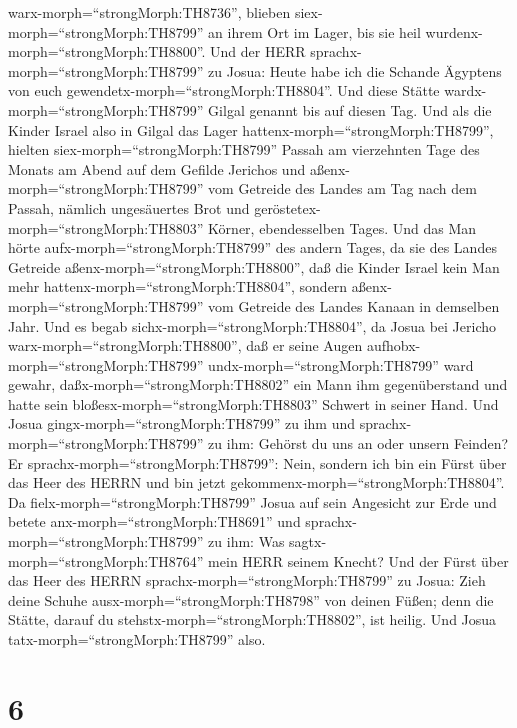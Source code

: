 warx-morph=``strongMorph:TH8736'', blieben
siex-morph=``strongMorph:TH8799'' an ihrem Ort im Lager, bis sie heil
wurdenx-morph=``strongMorph:TH8800''.  Und der HERR
sprachx-morph=``strongMorph:TH8799'' zu Josua: Heute habe ich die
Schande Ägyptens von euch gewendetx-morph=``strongMorph:TH8804''. Und
diese Stätte wardx-morph=``strongMorph:TH8799'' Gilgal genannt bis auf
diesen Tag.  Und als die Kinder Israel also in Gilgal das
Lager hattenx-morph=``strongMorph:TH8799'', hielten
siex-morph=``strongMorph:TH8799'' Passah am vierzehnten Tage des Monats
am Abend auf dem Gefilde Jerichos  und
aßenx-morph=``strongMorph:TH8799'' vom Getreide des Landes am Tag nach
dem Passah, nämlich ungesäuertes Brot und
geröstetex-morph=``strongMorph:TH8803'' Körner, ebendesselben Tages.
 Und das Man hörte aufx-morph=``strongMorph:TH8799'' des
andern Tages, da sie des Landes Getreide
aßenx-morph=``strongMorph:TH8800'', daß die Kinder Israel kein Man mehr
hattenx-morph=``strongMorph:TH8804'', sondern
aßenx-morph=``strongMorph:TH8799'' vom Getreide des Landes Kanaan in
demselben Jahr.  Und es begab
sichx-morph=``strongMorph:TH8804'', da Josua bei Jericho
warx-morph=``strongMorph:TH8800'', daß er seine Augen
aufhobx-morph=``strongMorph:TH8799'' undx-morph=``strongMorph:TH8799''
ward gewahr, daßx-morph=``strongMorph:TH8802'' ein Mann ihm
gegenüberstand und hatte sein bloßesx-morph=``strongMorph:TH8803''
Schwert in seiner Hand. Und Josua gingx-morph=``strongMorph:TH8799'' zu
ihm und sprachx-morph=``strongMorph:TH8799'' zu ihm: Gehörst du uns an
oder unsern Feinden?  Er
sprachx-morph=``strongMorph:TH8799'': Nein, sondern ich bin ein Fürst
über das Heer des HERRN und bin jetzt
gekommenx-morph=``strongMorph:TH8804''. Da
fielx-morph=``strongMorph:TH8799'' Josua auf sein Angesicht zur Erde und
betete anx-morph=``strongMorph:TH8691'' und
sprachx-morph=``strongMorph:TH8799'' zu ihm: Was
sagtx-morph=``strongMorph:TH8764'' mein HERR seinem Knecht?
 Und der Fürst über das Heer des HERRN
sprachx-morph=``strongMorph:TH8799'' zu Josua: Zieh deine Schuhe
ausx-morph=``strongMorph:TH8798'' von deinen Füßen; denn die Stätte,
darauf du stehstx-morph=``strongMorph:TH8802'', ist heilig. Und Josua
tatx-morph=``strongMorph:TH8799'' also.

\hypertarget{section-5}{%
\section{6}\label{section-5}}


